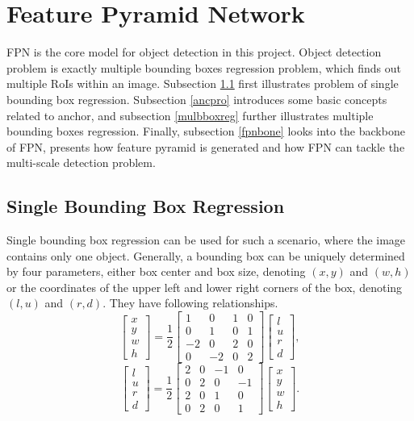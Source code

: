 \section{Feature Pyramid Network}\label{modfpn}
FPN \cite{fpn} is the core model for object detection in this project. Object detection problem is exactly multiple bounding boxes regression problem, which finds out multiple RoIs within an image. Subsection \ref{sglbboxreg} first illustrates problem of single bounding box regression. Subsection \ref{ancpro} introduces some basic concepts related to anchor, and subsection \ref{mulbboxreg} further illustrates multiple bounding boxes regression. Finally, subsection \ref{fpnbone} looks into the backbone of FPN, presents how feature pyramid is generated and how FPN can tackle the multi-scale detection problem.

\subsection{Single Bounding Box Regression}\label{sglbboxreg}
Single bounding box regression can be used for such a scenario, where the image contains only one object. Generally, a bounding box can be uniquely determined by four parameters, either box center and box size, denoting $(x, y)$ and $(w, h)$ or the coordinates of the upper left and lower right corners of the box, denoting $(l, u)$ and $(r, d)$. They have following relationships.
\begin{equation}
	\left[\begin{array}{c}
		x\\y\\w\\h
	\end{array}\right]=\frac{1}{2}\left[\begin{array}{cccc}
		1 & 0 & 1 & 0 \\
		0 & 1 & 0 & 1 \\
		-2 & 0 & 2 & 0 \\
		0 & -2 & 0 & 2
	\end{array}\right]\left[\begin{array}{c}
		l\\u\\r\\d
	\end{array}\right],
\end{equation}
\begin{equation}
	\left[\begin{array}{c}
		l\\u\\r\\d
	\end{array}\right]=\frac{1}{2}\left[\begin{array}{cccc}
		2 & 0 & -1 & 0 \\
		0 & 2 & 0 & -1 \\
		2 & 0 & 1 & 0 \\
		0 & 2 & 0 & 1
	\end{array}\right]\left[\begin{array}{c}
		x\\y\\w\\h
	\end{array}\right].
\end{equation}
